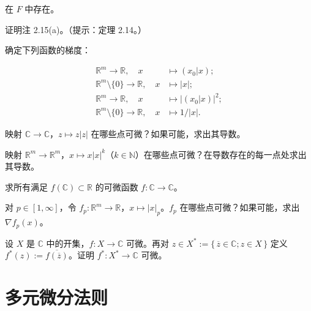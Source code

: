 \begin{exercises}
在 $ F $ 中存在。

\item

证明注 2.15(a)。（提示：定理 2.14。）

\item

确定下列函数的梯度：

\begin{equation*}
\begin{aligned}
\mathbb{R}^{m} \to \mathbb{R} , \quad x &\mapsto (x_{0}|x) ; \\ \mathbb{R}^{m}\setminus\{0\} \to \mathbb{R} , \quad x &\mapsto |x| ; \\ \mathbb{R}^{m} \to \mathbb{R} , \quad x &\mapsto \left|(x_{0}|x)\right|^{2} ; \\ \mathbb{R}^{m}\setminus\{0\} \to \mathbb{R} , \quad x &\mapsto 1/|x| .
\end{aligned}
\end{equation*}
\item

映射 $ \mathbb{C} \to \mathbb{C} $，$ z \mapsto z|z| $ 在哪些点可微？如果可能，求出其导数。

\item

映射 $ \mathbb{R}^{m} \to \mathbb{R}^{m} $，$ x \mapsto x|x|^{k} $（$ k \in \mathbb{N} $）在哪些点可微？在导数存在的每一点处求出其导数。

\item

求所有满足 $ f(\mathbb{C}) \subset \mathbb{R} $ 的可微函数 $ f : \mathbb{C} \to \mathbb{C} $。

\item

对 $ p \in [1,\infty] $，令 $ f_{p} : \mathbb{R}^{m} \to \mathbb{R} $，$ x \mapsto |x|_{p} $。$ f_{p} $ 在哪些点可微？如果可能，求出 $ \nabla f_{p}(x) $。

\item

设 $ X $ 是 $ \mathbb{C} $ 中的开集，$ f : X \to \mathbb{C} $ 可微。再对 $ z \in X^{*} := \{\, \overline{z} \in \mathbb{C} ; z \in X \,\} $ 定义 $ f^{*}(z) := \overline{f(\overline{z})} $。证明 $ f^{*} : X^{*} \to \mathbb{C} $ 可微。

\end{exercises}

\section{多元微分法则}

